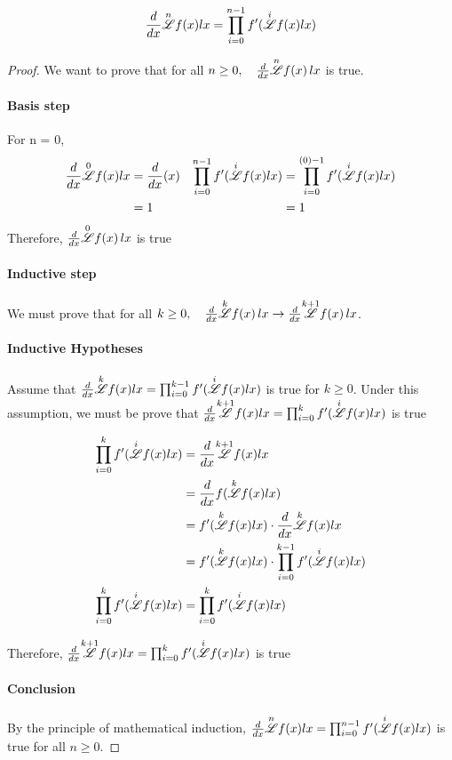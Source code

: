 \documentclass[12pt, letterpaper]{article}
\begin{document}
$$\frac{d}{dx}\overset{n}{\mathscr{L}}f(x)lx = \prod^{n-1}_{i=0}f'(\overset{i}{\mathscr{L}}f(x)lx)$$

\begin{proof}
    We want to prove that for all $n \ge 0, \quad \frac{d}{dx}\overset{n}{\mathscr{L}} f(x) \, lx$  is true.

    \paragraph{Basis step}
    For n = 0, 
    \begin{align*}
        \frac{d}{dx}\overset{0}{\mathscr{L}} f(x) lx &= \frac{d}{dx}(x) &
        \prod^{n-1}_{i=0}f'(\overset{i}{\mathscr{L}}f(x)lx) &= \prod^{(0)-1}_{i=0}f'(\overset{i}{\mathscr{L}}f(x)lx) \\
        &= 1 &&= 1 
    \end{align*}
    Therefore, $\frac{d}{dx}\overset{0}{\mathscr{L}} f(x) \, lx$ is true

    \paragraph{Inductive step}

    We must prove that for all $k \ge 0, \quad \frac{d}{dx}\overset{k}{\mathscr{L}} f(x) \, lx \to \frac{d}{dx}\overset{k+1}{\mathscr{L}} f(x) \, lx$.

    \paragraph{Inductive Hypotheses}
    Assume that $\frac{d}{dx}\overset{k}{\mathscr{L}} f(x) lx = \prod^{k-1}_{i=0}f'(\overset{i}{\mathscr{L}}f(x)lx)$ is true for $k \ge 0$.
    Under this assumption, we must be prove that $\frac{d}{dx}\overset{k+1}{\mathscr{L}} f(x) lx = \prod^{k}_{i=0}f'(\overset{i}{\mathscr{L}}f(x)lx)$ is true

    \begin{align*}
        \prod^{k}_{i=0}f'(\overset{i}{\mathscr{L}}f(x)lx) &= \frac{d}{dx}\overset{k+1}{\mathscr{L}} f(x) lx \\ 
        &= \frac{d}{dx}f(\overset{k}{\mathscr{L}} f(x) lx) \\ 
        &= f'(\overset{k}{\mathscr{L}} f(x) lx)\cdot \frac{d}{dx}\overset{k}{\mathscr{L}} f(x) lx \\
        &= f'(\overset{k}{\mathscr{L}} f(x) lx)\cdot \prod^{k-1}_{i=0}f'(\overset{i}{\mathscr{L}}f(x)lx) \\ 
        \prod^{k}_{i=0}f'(\overset{i}{\mathscr{L}}f(x)lx) &= \prod^{k}_{i=0}f'(\overset{i}{\mathscr{L}}f(x)lx) \\ 
    \end{align*}

    Therefore, $\frac{d}{dx}\overset{k+1}{\mathscr{L}} f(x) lx = \prod^{k}_{i=0}f'(\overset{i}{\mathscr{L}}f(x)lx)$ is true

    \paragraph{Conclusion} By the principle of mathematical induction, $\frac{d}{dx}\overset{n}{\mathscr{L}} f(x) lx = \prod^{n-1}_{i=0}f'(\overset{i}{\mathscr{L}}f(x)lx)$ is true for all $n \ge 0$.
    
\end{proof}
\end{document}
